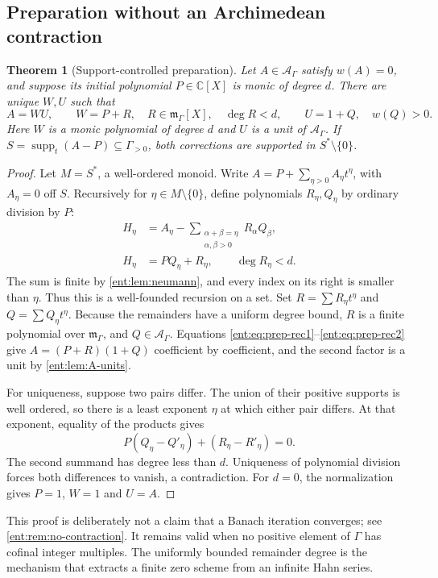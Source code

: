 \documentclass[11pt]{article}
\newtheorem{theorem}{Theorem}[section]
\theoremstyle{plain}
\theoremstyle{plain}
\theoremstyle{plain}
\theoremstyle{definition}
\theoremstyle{definition}
\theoremstyle{definition}
\theoremstyle{definition}
\theoremstyle{remark}
\newcommand{\C}{\mathbb C}\newcommand{\R}{\mathbb R}
\newcommand{\A}{\mathcal A_\Gamma}\newcommand{\OO}{\mathcal O_\Gamma}
\newcommand{\mm}{\mathfrak m_\Gamma}
\DeclareMathOperator{\supp}{supp}\DeclareMathOperator{\lc}{lc}
\begin{document}
\subsection{Preparation without an Archimedean contraction}
\begin{theorem}[Support-controlled preparation]\label{ent:thm:prep}
Let $A\in\A$ satisfy $w(A)=0$, and suppose its initial polynomial
$P\in\C[X]$ is monic of degree $d$. There are unique $W,U$ such that
\[
 A=WU,\qquad
 W=P+R,\quad R\in\mm[X],\quad\deg R<d,\qquad
 U=1+Q,\quad w(Q)>0.
\]
Here $W$ is a monic polynomial of degree $d$ and $U$ is a unit of $\A$. If
$S=\supp_t(A-P)\subseteq\Gamma_{>0}$, both corrections are supported in
$S^*\setminus\{0\}$.
\end{theorem}
\begin{proof}
Let $M=S^*$, a well-ordered monoid. Write $A=P+\sum_{\eta>0}A_\eta t^\eta$,
with $A_\eta=0$ off $S$. Recursively for $\eta\in M\setminus\{0\}$, define
polynomials $R_\eta,Q_\eta$ by ordinary division by $P$:
\begin{align}
 H_\eta&=A_\eta-
   \sum_{\substack{\alpha+\beta=\eta\\\alpha,\beta>0}}
       R_\alpha Q_\beta,\label{ent:eq:prep-rec1}\\
 H_\eta&=P Q_\eta+R_\eta,\qquad\deg R_\eta<d.
 \label{ent:eq:prep-rec2}
\end{align}
The sum is finite by \cref{ent:lem:neumann}, and every index on its right is
smaller than $\eta$. Thus this is a well-founded recursion on a set. Set
$R=\sum R_\eta t^\eta$ and $Q=\sum Q_\eta t^\eta$. Because the remainders
have a uniform degree bound, $R$ is a finite polynomial over $\mm$, and
$Q\in\A$. Equations
\eqref{ent:eq:prep-rec1}--\eqref{ent:eq:prep-rec2} give $A=(P+R)(1+Q)$
coefficient by coefficient, and the second factor is a unit by
\cref{ent:lem:A-units}.

For uniqueness, suppose two pairs differ. The union of their positive
supports is well ordered, so there is a least exponent $\eta$ at which either
pair differs. At that exponent, equality of the products gives
\[
 P(Q_\eta-Q'_\eta)+(R_\eta-R'_\eta)=0.
\]
The second summand has degree less than $d$. Uniqueness of polynomial
division forces both differences to vanish, a contradiction. For $d=0$, the
normalization gives $P=1$, $W=1$ and $U=A$.
\end{proof}

This proof is deliberately not a claim that a Banach iteration converges; see
\cref{ent:rem:no-contraction}. It remains valid when no positive element of
$\Gamma$ has cofinal integer multiples. The uniformly bounded remainder
degree is the mechanism that extracts a finite zero scheme from an infinite
Hahn series.
\end{document}
